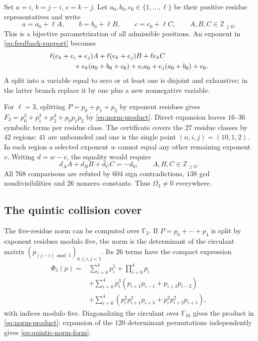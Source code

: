 \documentclass[11pt]{article}
\theoremstyle{definition}
\theoremstyle{remark}
\begin{document}
Set $a=i$, $b=j-i$, $c=k-j$.
Let $a_0,b_0,c_0\in\{1,\ldots,\ell\}$ be their positive residue
representatives and write
\[
 a=a_0+\ell A,\qquad b=b_0+\ell B,\qquad c=c_0+\ell C,
 \qquad A,B,C\in\mathbb Z_{\ge0}.
\]
This is a bijective parametrization of all admissible positions.
An exponent in \eqref{eq:feedback-support} becomes
\begin{equation}\label{eq:gap-exponent}
\begin{split}
 &\ell(e_k+e_i+e_j)A+\ell(e_k+e_j)B+\ell e_k C\\
 &\hspace{12mm}
   +e_k(a_0+b_0+c_0)+e_i a_0+e_j(a_0+b_0)+e_0 .
\end{split}
\end{equation}
A split into a variable equal to zero or at least one is disjoint
and exhaustive; in the latter branch replace it by one plus a new
nonnegative variable.

For $\ell=3$, splitting $P=p_0+p_1+p_2$ by exponent residues gives
$F_3=p_0^3+p_1^3+p_2^3+p_0p_1p_2$ by \eqref{eq:norm-product}.
Direct expansion leaves $16$--$36$ symbolic
terms per residue class. The certificate covers the $27$ residue
classes by $42$ regions: $41$ are unbounded and one is the single
point \mbox{$(n,i,j)=(10,1,2)$}.
In each region a selected exponent $w$ cannot equal any other
remaining exponent $v$. Writing $d=w-v$, the equality would require
\[
 d_A A+d_B B+d_C C=-d_0,\qquad A,B,C\in\mathbb Z_{\ge0}.
\]
All $768$ comparisons are refuted by $604$ sign contradictions,
$138$ gcd nondivisibilities and $26$ nonzero constants.
Thus $\Omega_3\ne0$ everywhere.

\subsection{The quintic collision cover}
The five-residue norm can be computed over $\mathbb F_2$.
If $P=p_0+\cdots+p_4$ is split by exponent residues modulo five,
the norm is the determinant of the circulant matrix
$(p_{(j-i)\bmod5})_{0\le i,j<5}$.
Its $26$ terms have the compact expression
\begin{equation}\label{eq:quintic-norm-form}
\begin{split}
 \Phi_5(p)={}&\sum_{i=0}^4p_i^5+\prod_{i=0}^4p_i\\
 &+\sum_{i=0}^4p_i^3
          (p_{i+1}p_{i-1}+p_{i+2}p_{i-2})\\
 &+\sum_{i=0}^4
       (p_i^2p_{i+1}^2p_{i+3}+p_i^2p_{i+2}^2p_{i+1}),
\end{split}
\end{equation}
with indices modulo five. Diagonalizing the circulant over
$\mathbb F_{16}$ gives the product in \eqref{eq:norm-product};
expansion of the $120$ determinant permutations independently
gives \eqref{eq:quintic-norm-form}.
\end{document}
